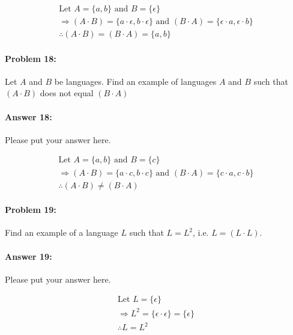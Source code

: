 \documentclass[10pt]{article}
\begin{document}
\begin{gather*}
    \text{Let } A = \{a, b\} \text{ and } B = \{\epsilon\}\\
    \Rightarrow (A\cdot B)=\{a\cdot \epsilon, b\cdot \epsilon \} \text{ and } (B\cdot A)=\{\epsilon \cdot a, \epsilon \cdot b\}\\
    \therefore (A\cdot B)=(B\cdot A)=\{a, b\}
\end{gather*}

\noindent\hrulefill %

\paragraph{Problem 18:}
Let $A$ and $B$ be languages. Find an example of languages $A$ and $B$
such that $(A\cdot B)$ does not equal $(B\cdot A)$

\paragraph{Answer 18:} Please put your answer here.

\begin{gather*}
    \text{Let } A = \{a, b\} \text{ and } B = \{c\}\\
    \Rightarrow (A\cdot B)=\{a\cdot c, b\cdot c \} \text{ and } (B\cdot A)=\{c\cdot a, c\cdot b\}  \\
    \therefore (A\cdot B)\neq (B\cdot A)
\end{gather*}


\noindent\hrulefill %

\paragraph{Problem 19:}
Find an example of a language $L$ such that $L=L^2$,
i.e. $L=(L\cdot L)$.

\paragraph{Answer 19:} Please put your answer here.

\begin{gather*}
    \text{Let } L = \{\epsilon\} \\
    \Rightarrow L^2 = \{\epsilon \cdot \epsilon\}=\{\epsilon\}  \\
    \therefore L = L^2
\end{gather*}


\noindent\hrulefill %
\end{document}
